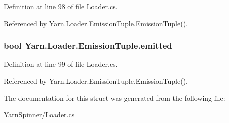 Definition at line 98 of file Loader.\-cs.



Referenced by Yarn.\-Loader.\-Emission\-Tuple.\-Emission\-Tuple().

\hypertarget{a00099_a5916dbbd4d2e24ddfd02b0afdea290bf}{
\subsubsection[{emitted}]{\setlength{\rightskip}{0pt plus 5cm}bool Yarn.\-Loader.\-Emission\-Tuple.\-emitted}}\label{a00099_a5916dbbd4d2e24ddfd02b0afdea290bf}


Definition at line 99 of file Loader.\-cs.



Referenced by Yarn.\-Loader.\-Emission\-Tuple.\-Emission\-Tuple().



The documentation for this struct was generated from the following file\-:\begin{DoxyCompactItemize}
\item 
Yarn\-Spinner/\hyperlink{a00315}{Loader.\-cs}\end{DoxyCompactItemize}
